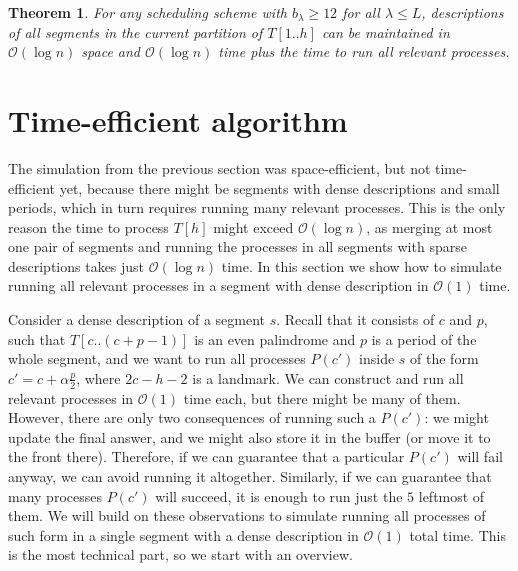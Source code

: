 \documentclass{article}[11pt,letter]
\newtheorem{theorem}[definition]{Theorem}
\newcommand{\bigo}{\mathcal{O}}
\newcommand{\head}{h}
\newcommand{\level}{\lambda}
\newcommand{\kpers}{\ensuremath{p}}
\begin{document}
\begin{theorem}
\label{memory_efficient}
For any scheduling scheme with $b_{\level}\geq 12$ for all $\level\leq L$, descriptions of all segments in the current
partition of $T[1..\head]$ can be maintained in $\bigo(\log n)$ space and $\bigo(\log n)$ time plus the
time to run all relevant processes.
\end{theorem}

\section{Time-efficient algorithm}
\label{section:time2}
The simulation from the previous section was space-efficient, but not time-efficient yet, because there might be segments with
dense descriptions and small periods, which in turn requires running many relevant processes. 
This is the only reason the time to process $T[\head]$ might exceed $\bigo(\log n)$, as merging at most one pair of segments and
running the processes in all segments with sparse descriptions takes just $\bigo(\log n)$ time. In this section we show how to simulate
running all relevant processes in a segment with dense description in $\bigo(1)$ time.

Consider a dense description of a segment $s$. Recall that it consists of $c$ and $\kpers$, such that $T[c..(c+\kpers-1)]$ is an even palindrome
and $\kpers$ is a period of the whole segment, and we want to run
all processes $P(c')$ inside $s$ of the form $c'=c+\alpha\frac{\kpers}{2}$, where $2c-\head-2$ is a landmark.
We can construct and run all relevant processes in $\bigo(1)$ time each, but there might be many of them. However, there are
only two consequences of running such a $P(c')$: we might update the final answer, and we might also store it in the buffer (or move it to the front there).
Therefore, if we can guarantee that a particular $P(c')$ will fail anyway, we can avoid running it altogether. Similarly, if we can guarantee that many
processes $P(c')$ will succeed, it is enough to run just the $5$ leftmost of them.
We will build on these observations to simulate running all processes of such form in a single segment with a dense description in $\bigo(1)$ total time.
This is the most technical part, so we start with an overview.
\end{document}
